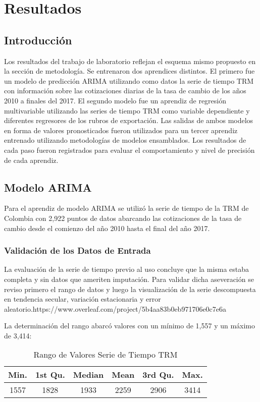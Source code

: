\setcounter{chapter}{3}
\chapter{Resultados}
\section{Introducción}
Los resultados del trabajo de laboratorio reflejan el esquema mismo propuesto en la sección de metodología. Se entrenaron dos aprendices distintos. El primero fue un modelo de predicción ARIMA utilizando como datos la serie de tiempo TRM con información sobre las cotizaciones diarias de la tasa de cambio de los años 2010 a finales del 2017. El segundo modelo fue un aprendiz de regresión multivariable utilizando las series de tiempo TRM como variable dependiente y diferentes regresores de los rubros de exportación. Las salidas de ambos modelos en forma de valores pronosticados fueron utilizados para un tercer aprendiz entrenado utilizando metodologías de modelos ensamblados. Los resultados de cada paso fueron registrados para evaluar el comportamiento y nivel de precisión de cada aprendiz. 

\section{Modelo ARIMA}
Para el aprendiz de modelo ARIMA se utilizó la serie de tiempo de la TRM de Colombia con 2,922 puntos de datos abarcando las cotizaciones de la tasa de cambio desde el comienzo del año 2010 hasta el final del año 2017. 

\subsection{Validación de los Datos de Entrada}
La evaluación de la serie de tiempo previo al uso concluye que la misma estaba completa y sin datos que ameriten imputación. Para validar dicha aseveración se reviso primero el rango de datos y luego la visualización de la serie descompuesta en tendencia secular, variación estacionaria y error aleatorio.https://www.overleaf.com/project/5b4aa83b0eb971706e0c7e6a

La determinación del rango abarcó valores con un mínimo de 1,557 y un máximo de 3,414:

\begin{table}[h!]
  \begin{center}
    \caption{Rango de Valores Serie de Tiempo TRM}
    \label{tab:table1}
    \begin{tabular}{c|c|c|c|c|c} 
      \textbf{Min.} & \textbf{1st Qu.} & \textbf{Median} & \textbf{Mean} & \textbf{3rd Qu.} & \textbf{Max.}\\
      \hline
      1557 & 1828 & 1933 & 2259 & 2906 & 3414\\
    \end{tabular}
  \end{center}
\end{table}

